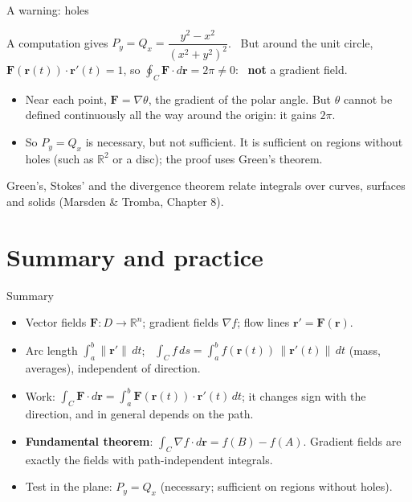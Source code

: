 \documentclass[10pt]{wosm-slides}
\newcommand{\R}{\mathbb{R}}
\newcommand{\norm}[1]{\lVert #1 \rVert}
\newcommand{\vr}{\mathbf{r}}
\newcommand{\vF}{\mathbf{F}}
\begin{document}
\begin{frame}{A warning: holes}
  \begin{example}[$\vF = \dfrac{(-y, \ x)}{x^2 + y^2}$ on $\R^2 \setminus \{\mathbf 0\}$]
    A computation gives $P_y = Q_x = \dfrac{y^2 - x^2}{(x^2 + y^2)^2}$. \ But around the unit circle,
    $\vF(\vr(t)) \cdot \vr'(t) = 1$, so $\oint_C \vF \cdot d\vr = 2\pi \ne 0$: \ \textbf{not} a gradient field.
  \end{example}
  \pause
  \begin{itemize}
    \item Near each point, $\vF = \nabla\theta$, the gradient of the polar angle. But $\theta$ cannot be
      defined continuously all the way around the origin: it gains $2\pi$.
    \item So $P_y = Q_x$ is necessary, but not sufficient. It is sufficient on regions without holes
      (such as $\R^2$ or a disc); the proof uses Green's theorem.
  \end{itemize}
  \pause
  {\small Green's, Stokes' and the divergence theorem relate integrals over curves, surfaces and
  solids (Marsden \& Tromba, Chapter 8).\par}
\end{frame}

\section{Summary and practice}

\begin{frame}{Summary}
  \begin{itemize}
    \item Vector fields $\vF\colon D \to \R^n$; gradient fields $\nabla f$; flow lines $\vr' = \vF(\vr)$.
    \item Arc length $\int_a^b \norm{\vr'}\, dt$; \ $\int_C f\, ds = \int_a^b f(\vr(t))\, \norm{\vr'(t)}\, dt$
      (mass, averages), independent of direction.
    \item Work: $\int_C \vF \cdot d\vr = \int_a^b \vF(\vr(t)) \cdot \vr'(t)\, dt$; it changes sign with the
      direction, and in general depends on the path.
    \item \textbf{Fundamental theorem}: $\int_C \nabla f \cdot d\vr = f(B) - f(A)$. Gradient fields are
      exactly the fields with path-independent integrals.
    \item Test in the plane: $P_y = Q_x$ (necessary; sufficient on regions without holes).
  \end{itemize}
\end{frame}
\end{document}
